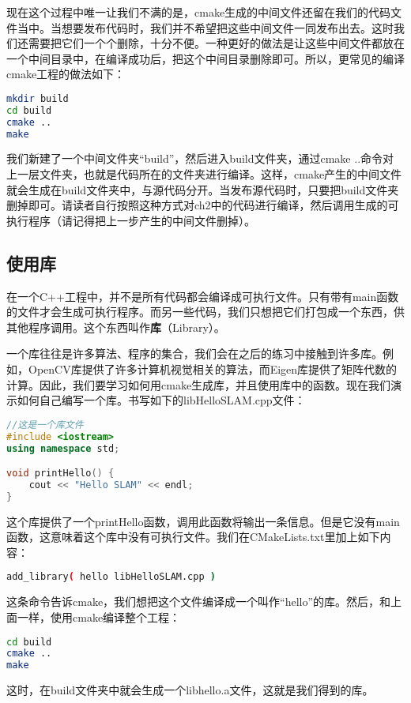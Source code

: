 现在这个过程中唯一让我们不满的是，cmake生成的中间文件还留在我们的代码文件当中。当想要发布代码时，我们并不希望把这些中间文件一同发布出去。这时我们还需要把它们一个个删除，十分不便。一种更好的做法是让这些中间文件都放在一个中间目录中，在编译成功后，把这个中间目录删除即可。所以，更常见的编译cmake工程的做法如下：
\clearpage

\begin{lstlisting}[language=sh,caption=终端输入：]
mkdir build
cd build
cmake ..
make
\end{lstlisting}

我们新建了一个中间文件夹“build”，然后进入build文件夹，通过cmake ..命令对上一层文件夹，也就是代码所在的文件夹进行编译。这样，cmake产生的中间文件就会生成在build文件夹中，与源代码分开。当发布源代码时，只要把build文件夹删掉即可。请读者自行按照这种方式对ch2中的代码进行编译，然后调用生成的可执行程序（请记得把上一步产生的中间文件删掉）。

\subsection{使用库}
在一个C++工程中，并不是所有代码都会编译成可执行文件。只有带有main函数的文件才会生成可执行程序。而另一些代码，我们只想把它们打包成一个东西，供其他程序调用。这个东西叫作\textbf{库}（Library）。

一个库往往是许多算法、程序的集合，我们会在之后的练习中接触到许多库。例如，OpenCV库提供了许多计算机视觉相关的算法，而Eigen库提供了矩阵代数的计算。因此，我们要学习如何用cmake生成库，并且使用库中的函数。现在我们演示如何自己编写一个库。书写如下的libHelloSLAM.cpp文件：

\begin{lstlisting}[language=c++,caption=slambook2/ch2/libHelloSLAM.cpp]
//这是一个库文件
#include <iostream>
using namespace std;

void printHello() {
	cout << "Hello SLAM" << endl;
}
\end{lstlisting}

这个库提供了一个printHello函数，调用此函数将输出一条信息。但是它没有main函数，这意味着这个库中没有可执行文件。我们在CMakeLists.txt里加上如下内容：
\begin{lstlisting}[language=sh,caption=slambook2/ch2/CMakeLists.txt]
add_library( hello libHelloSLAM.cpp )
\end{lstlisting}

这条命令告诉cmake，我们想把这个文件编译成一个叫作“hello”的库。然后，和上面一样，使用cmake编译整个工程：
\begin{lstlisting}[language=sh,caption=终端输入：]
cd build
cmake ..
make
\end{lstlisting}
这时，在build文件夹中就会生成一个libhello.a文件，这就是我们得到的库。

